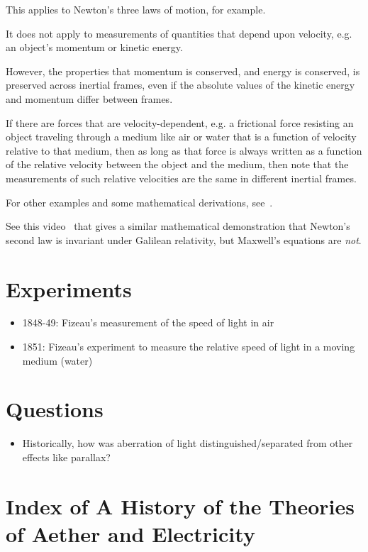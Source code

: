 \documentclass[a4paper]{article}
\theoremstyle{plain}
\theoremstyle{definition}
\begin{document}
This applies to Newton's three laws of motion, for example.

It does not apply to measurements of quantities that depend upon
velocity, e.g. an object's momentum or kinetic energy.

However, the properties that momentum is conserved, and energy is
conserved, is preserved across inertial frames, even if the absolute
values of the kinetic energy and momentum differ between frames.

If there are forces that are velocity-dependent, e.g. a frictional
force resisting an object traveling through a medium like air or water
that is a function of velocity relative to that medium, then as long
as that force is always written as a function of the relative velocity
between the object and the medium, then note that the measurements of
such relative velocities are the same in different inertial frames.

For other examples and some mathematical derivations,
see~\cite{GalileanTransformation}.

See this video~\cite{GalileanInvarianceMaxwellsEquations} that gives a
similar mathematical demonstration that Newton's second law is
invariant under Galilean relativity, but Maxwell's equations are {\em
  not}.


\section{Experiments}

\begin{itemize}
\item 1848-49: Fizeau's measurement of the speed of light in
  air~\cite{Fizeau1849}
\item 1851: Fizeau's experiment to measure the relative speed of light
  in a moving medium (water)~\cite{Fizeau1851}
\end{itemize}


\section{Questions}

\begin{itemize}
\item Historically, how was aberration of light
  distinguished/separated from other effects like parallax?
\end{itemize}


\section{Index of A History of the Theories of Aether and Electricity}
\end{document}
